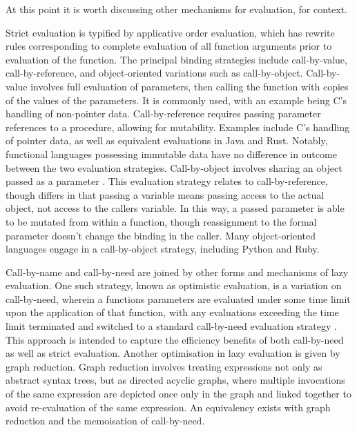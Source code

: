 At this point it is worth discussing other mechanisms for evaluation, for context.

Strict evaluation is typified by applicative order evaluation, which has rewrite rules corresponding to complete evaluation of all function arguments prior to evaluation of the function\cite{abelson1996sicp:order}.
The principal binding strategies include call-by-value, call-by-reference, and object-oriented variations such as call-by-object.
Call-by-value involves full evaluation of parameters, then calling the function with copies of the values of the parameters\cite{plotkin1975callnameval}.
It is commonly used, with an example being C's handling of non-pointer data.
Call-by-reference requires passing parameter references to a procedure, allowing for mutability\cite{turbak2008design}.
Examples include C's handling of pointer data, as well as equivalent evaluations in Java and Rust.
Notably, functional languages possessing immutable data have no difference in outcome between the two evaluation strategies.
Call-by-object involves sharing an object passed as a parameter \cite{liskov1979clu}.
This evaluation strategy relates to call-by-reference, though differs in that passing a variable means passing access to the actual object, not access to the callers variable.
In this way, a passed parameter is able to be mutated from within a function, though reassignment to the formal parameter doesn't change the binding in the caller.
Many object-oriented languages engage in a call-by-object strategy, including Python and Ruby.

Call-by-name and call-by-need are joined by other forms and mechanisms of lazy evaluation.
One such strategy, known as optimistic evaluation, is a variation on call-by-need, wherein a functions parameters are evaluated under some time limit upon the application of that function, with any evaluations exceeding the time limit terminated and switched to a standard call-by-need evaluation strategy \cite{ennals2003optimistic}.
This approach is intended to capture the efficiency benefits of both call-by-need as well as strict evaluation.
Another optimisation in lazy evaluation is given by graph reduction.
Graph reduction involves treating expressions not only as abstract syntax trees, but as directed acyclic graphs, where multiple invocations of the same expression are depicted once only in the graph and linked together to avoid re-evaluation of the same expression\cite{hudak1989functional}.
An equivalency exists with graph reduction and the memoisation of call-by-need.

